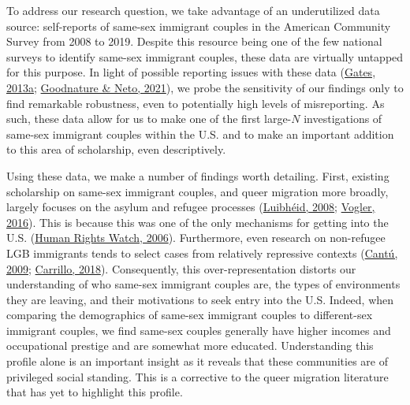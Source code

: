 \documentclass[
  11pt,
]{article}
\begin{document}
To address our research question, we take advantage of an underutilized data source: self-reports of same-sex immigrant couples in the American Community Survey from 2008 to 2019. Despite this resource being one of the few national surveys to identify same-sex immigrant couples, these data are virtually untapped for this purpose. In light of possible reporting issues with these data (\protect\hyperlink{ref-gates_2013}{Gates, 2013a}; \protect\hyperlink{ref-goodnature_2021}{Goodnature \& Neto, 2021}), we probe the sensitivity of our findings only to find remarkable robustness, even to potentially high levels of misreporting. As such, these data allow for us to make one of the first large-\(N\) investigations of same-sex immigrant couples within the U.S. and to make an important addition to this area of scholarship, even descriptively.

Using these data, we make a number of findings worth detailing. First, existing scholarship on same-sex immigrant couples, and queer migration more broadly, largely focuses on the asylum and refugee processes (\protect\hyperlink{ref-luibheid_2008}{Luibhéid, 2008}; \protect\hyperlink{ref-vogler_2016}{Vogler, 2016}). This is because this was one of the only mechanisms for getting into the U.S. (\protect\hyperlink{ref-humanrightswatch_2006}{Human Rights Watch, 2006}). Furthermore, even research on non-refugee LGB immigrants tends to select cases from relatively repressive contexts (\protect\hyperlink{ref-cantu_2009}{Cantú, 2009}; \protect\hyperlink{ref-carrillo_2018}{Carrillo, 2018}). Consequently, this over-representation distorts our understanding of who same-sex immigrant couples are, the types of environments they are leaving, and their motivations to seek entry into the U.S. Indeed, when comparing the demographics of same-sex immigrant couples to different-sex immigrant couples, we find same-sex couples generally have higher incomes and occupational prestige and are somewhat more educated. Understanding this profile alone is an important insight as it reveals that these communities are of privileged social standing. This is a corrective to the queer migration literature that has yet to highlight this profile.
\end{document}

